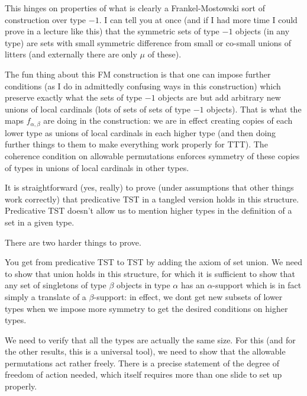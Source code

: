 \documentclass{slides}
\begin{document}
\begin{slide}

This hinges on properties of what is clearly a Frankel-Mostowski sort of construction over type $-1$.  I can tell you at once (and if I had more time I could prove in a lecture like this) that the symmetric sets of type $-1$ objects (in any type) are
sets with small symmetric difference from small or co-small unions of litters (and externally there are only $\mu$ of these).

The fun thing about this FM construction is that one can impose further conditions (as I do in admittedly confusing ways in this construction) which preserve exactly what the sets of type $-1$ objects are but add arbitrary new unions of local cardinals (lots of sets of sets of type $-1$ objects).
That is what the maps $f_{\alpha,\beta}$ are doing in the construction:  we are in effect creating copies of each lower type
as unions of local cardinals in each higher type (and then doing further things to them to make everything work properly for TTT).  The coherence condition on allowable permutations enforces symmetry of these copies of types in unions of local cardinals in other types.

It is straightforward (yes, really) to prove (under assumptions that other things work correctly) that predicative TST in a tangled version holds in this structure.  Predicative TST doesn't allow us to mention higher types in the definition of a set in a given type.

There are two harder things to prove.

You get from predicative TST to TST by adding the axiom of set union.  We need to show that union holds in this structure, for which it is sufficient to show that any set of singletons of type $\beta$ objects in type $\alpha$ has an $\alpha$-support which is in fact simply a translate of a $\beta$-support:  in effect, we dont get new subsets of lower types when we impose more symmetry to get the desired conditions on higher types.

We need to verify that all the types are actually the same size.  For this (and for the other results, this is a universal tool), we need to show that the allowable permutations act rather freely.  There is a precise statement of the degree of freedom of action needed, which itself requires more than one slide to set up properly.

\end{slide}
\end{document}
